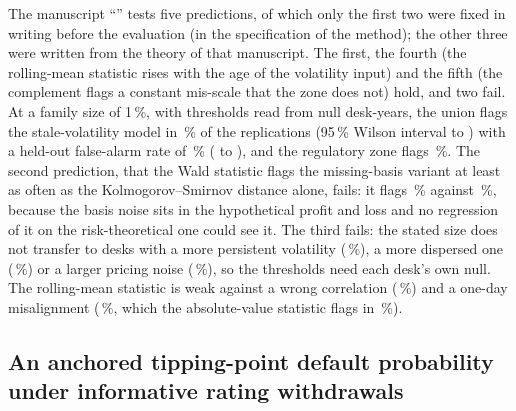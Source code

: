 The manuscript ``\pxPaperTitleThirteen{}'' tests five predictions, of which only the first two were fixed in writing before the evaluation (in the specification of the method); the other three were written from the theory of that manuscript. The first, the fourth (the rolling-mean statistic rises with the age of the volatility input) and the fifth (the complement
flags a constant mis-scale that the zone does not) hold, and two fail. At a family size of 1\,\%, with thresholds read from \pxPpThirteenNull{} null desk-years, the union flags the stale-volatility model in
\pxPpThirteenUnion{}\,\% of the replications (95\,\% Wilson interval \pxPpThirteenUnionLo{} to \pxPpThirteenUnionHi{}) with a held-out false-alarm rate of \pxPpThirteenHeld{}\,\% (\pxPpThirteenHeldLo{} to
\pxPpThirteenHeldHi{}), and the regulatory zone flags \pxPpThirteenZone{}\,\%. The second prediction, that the Wald statistic flags the missing-basis variant at least as often as the Kolmogorov--Smirnov distance
alone, fails: it flags \pxPpThirteenMissingWald{}\,\% against \pxPpThirteenMissingKs{}\,\%, because the basis noise sits in the hypothetical profit and loss and no regression of it on the risk-theoretical one
could see it. The third fails: the stated size does not transfer to desks with a more persistent volatility (\pxPpThirteenPersist{}\,\%), a more dispersed one (\pxPpThirteenDisp{}\,\%) or a larger pricing noise
(\pxPpThirteenNoise{}\,\%), so the thresholds need each desk's own null. The rolling-mean statistic is weak against a wrong correlation (\pxPpThirteenWrong{}\,\%) and a one-day misalignment
(\pxPpThirteenMisalign{}\,\%, which the absolute-value statistic flags in \pxPpThirteenMisalignAbs{}\,\%).

\subsection{An anchored tipping-point default probability under informative rating withdrawals}
\label{sec:bs14}


